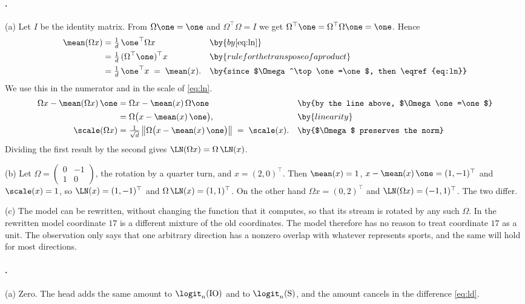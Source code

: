 {\paragraph{.}
(a) Let $I$ be the identity matrix. From $\Omega\one=\one$ and $\Omega^\top\Omega=I$ we get
$\Omega^\top\one=\Omega^\top\Omega\one=\one$. Hence
\begin{align*}
\mean(\Omega x) &= \tfrac1d\,\one^\top\Omega x && \by{by \eqref{eq:ln}}\\
&= \tfrac1d\,(\Omega^\top\one)^\top x && \by{rule for the transpose of a product}\\
&= \tfrac1d\,\one^\top x \;=\; \mean(x). && \by{since $\Omega^\top\one=\one$, then \eqref{eq:ln}}
\end{align*}
We use this in the numerator and in the scale of \eqref{eq:ln}.
\begin{align*}
\Omega x-\mean(\Omega x)\,\one &= \Omega x-\mean(x)\,\Omega\one && \by{by the line above, $\Omega\one=\one$}\\
&= \Omega\big(x-\mean(x)\,\one\big), && \by{linearity}\\
\scale(\Omega x) &= \tfrac{1}{\sqrt d}\,\big\|\Omega\big(x-\mean(x)\,\one\big)\big\| \;=\; \scale(x). && \by{$\Omega$ preserves the norm}
\end{align*}
Dividing the first result by the second gives $\LN(\Omega x)=\Omega\,\LN(x)$.

(b) Let $\Omega=\begin{pmatrix}0&-1\\1&0\end{pmatrix}$, the rotation by a quarter turn, and $x=(2,0)^\top$. Then
$\mean(x)=1$, $x-\mean(x)\,\one=(1,-1)^\top$ and $\scale(x)=1$, so $\LN(x)=(1,-1)^\top$ and
$\Omega\,\LN(x)=(1,1)^\top$. On the other hand $\Omega x=(0,2)^\top$ and $\LN(\Omega x)=(-1,1)^\top$. The two differ.

(c) The model can be rewritten, without changing the function that it computes, so that its stream is rotated by
any such $\Omega$. In the rewritten model coordinate $17$ is a different mixture of the old coordinates. The model
therefore has no reason to treat coordinate $17$ as a unit. The observation only says that one arbitrary direction
has a nonzero overlap with whatever represents sports, and the same will hold for most directions.

\paragraph{.}
(a) Zero. The head adds the same amount to $\logit_n(\mathrm{IO})$ and to $\logit_n(\mathrm{S})$, and the amount
cancels in the difference \eqref{eq:ld}.

}
